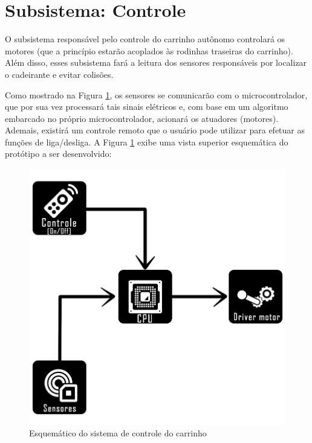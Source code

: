 \section{Subsistema: Controle}

\par O subsistema responsável pelo controle do carrinho autônomo controlará os motores (que a princípio estarão acoplados às rodinhas traseiras do carrinho). Além disso, esses subsistema fará a leitura dos sensores responsáveis por localizar o cadeirante e evitar colisões. 

\par Como mostrado na Figura \ref{fig:esqCarrinho}, os sensores se comunicarão com o microcontrolador, que por sua vez processará tais sinais elétricos e, com base em um algoritmo embarcado no próprio microcontrolador, acionará os atuadores (motores). Ademais, existirá um controle remoto que o usuário pode utilizar para efetuar as funções de liga/desliga. A Figura \ref{fig:esqCarrinho} exibe uma vista superior esquemática do protótipo a ser desenvolvido:


\begin{figure}[hb]
		\centering
		\includegraphics[width=.5\textwidth]{figuras/diagrama.png}
		\caption{Esquemático do sistema de controle do carrinho}
		\label{fig:esqCarrinho}
\end{figure} 

